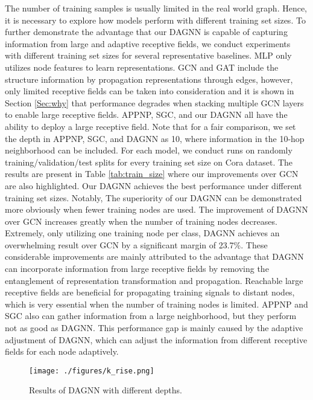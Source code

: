 \documentclass[sigconf]{acmart}
\begin{document}
The number of training samples is usually limited in the real
world graph. Hence, it is necessary to explore how models perform
with different training set sizes. To further demonstrate the
advantage that our DAGNN is capable of capturing information from
large and adaptive receptive fields, we conduct experiments with
different training set sizes for several representative
baselines. MLP only utilizes node features to learn
representations. GCN and GAT include the structure information by
propagation representations through edges, however, only limited
receptive fields can be taken into consideration and it is shown
in Section \ref{Sec:why} that performance degrades when stacking
multiple GCN layers to enable large receptive fields. APPNP, SGC,
and our DAGNN all have the ability to deploy a large receptive
field. Note that for a fair comparison, we set the depth in APPNP, SGC, and DAGNN as 10, where information in the 10-hop
neighborhood can be included. For each model, we conduct 
runs on randomly training/validation/test splits for every
training set size on Cora dataset. The results are present in
Table \ref{tab:train_size} where our improvements over GCN are
also highlighted. Our DAGNN achieves the best performance under
different training set sizes. Notably, The superiority of our
DAGNN can be demonstrated more obviously when fewer training nodes
are used. The improvement of DAGNN over GCN increases greatly when
the number of training nodes decreases. Extremely, only utilizing
one training node per class, DAGNN achieves an overwhelming result
over GCN by a significant margin of 23.7\%. These considerable
improvements are mainly attributed to the advantage that DAGNN can
incorporate information from large receptive fields by removing
the entanglement of representation transformation and
propagation. Reachable large receptive fields are beneficial for
propagating training signals to distant nodes, which is very
essential when the number of training nodes is limited. APPNP and SGC also can gather information from a large neighborhood, but
they perform not as good as DAGNN. This performance gap is mainly
caused by the adaptive adjustment of DAGNN, which can adjust the
information from different receptive fields for each node
adaptively.


\begin{figure}
\centering
\texttt{[image: ./figures/k\_rise.png]}
\caption{Results of DAGNN with different depths.}
\label{krise}
\end{figure}
\end{document}
